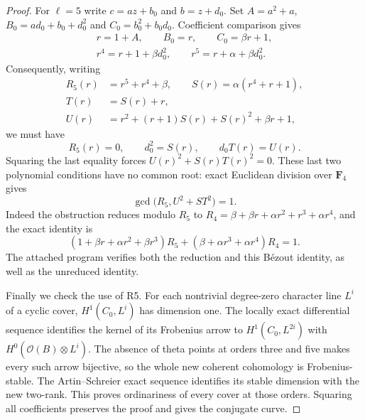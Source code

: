 \begin{proof}
For $\ell=5$ write $c=az+b_0$ and $b=z+d_0$.
Set $A=a^2+a$, $B_0=ad_0+b_0+d_0^2$ and
$C_0=b_0^2+b_0d_0$.  Coefficient comparison gives
\[
 \begin{gathered}
 r=1+A,\qquad B_0=r,\qquad C_0=\beta r+1,\\
 r^4=r+1+\beta d_0^2,\qquad
 r^5=r+\alpha+\beta d_0^2.
 \end{gathered}
\]
Consequently, writing
\[
 \begin{aligned}
 R_5(r)&=r^5+r^4+\beta,\qquad
 S(r)=\alpha(r^4+r+1),\\
 T(r)&=S(r)+r,\\
 U(r)&=r^2+(r+1)S(r)+S(r)^2+\beta r+1,
 \end{aligned}
\]
we must have
\[
                 R_5(r)=0,\qquad d_0^2=S(r),
                 \qquad d_0T(r)=U(r).
\]
Squaring the last equality forces
$U(r)^2+S(r)T(r)^2=0$.  These last two polynomial conditions have
no common root: exact Euclidean division over $\mathbf F_4$ gives
\[
              \gcd\bigl(R_5,U^2+ST^2\bigr)=1.             \tag{AC.10}
\]
Indeed the obstruction reduces modulo $R_5$ to
$R_4=\beta+\beta r+\alpha r^2+r^3+\alpha r^4$, and the exact identity is
\[
 (1+\beta r+\alpha r^2+\beta r^3)R_5
       +(\beta+\alpha r^3+\alpha r^4)R_4=1.
\]
The attached program  verifies both the
reduction and this B\'ezout identity, as well as the unreduced identity.

Finally we check the use of R5.  For each nontrivial degree-zero character
line $L^i$ of a cyclic cover, $H^1(C_0,L^i)$ has dimension one.
The locally exact differential sequence identifies the kernel of its
Frobenius arrow to $H^1(C_0,L^{2i})$ with
$H^0(\mathcal O(B)\otimes L^i)$.  The absence of theta points at orders
three and five makes every such arrow bijective, so the whole new
coherent cohomology is Frobenius-stable.  The Artin--Schreier exact
sequence identifies its stable dimension with the new two-rank.
This proves ordinariness of every cover at those orders.  Squaring all
coefficients preserves the proof and gives the conjugate curve.
\end{proof}

